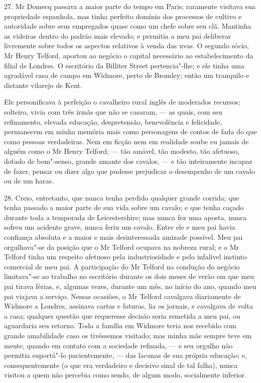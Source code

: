 27. Mr Domecq passava a maior parte do tempo em Paris; raramente
visitava sua propriedade espanhola, mas tinha perfeito domínio dos
processos de cultivo e autoridade sobre seus empregados quase como um
chefe sobre seu clã. Mantinha as videiras dentro do padrão mais elevado;
e permitia a meu pai deliberar livremente sobre todos os aspectos
relativos à venda das uvas. O segundo sócio, Mr Henry Telford, aportou
ao negócio o capital necessário ao estabelecimento da filial de Londres.
O escritório da Billiter Street pertencia"-lhe; e ele tinha uma agradável
casa de campo em Widmore, perto de Bromley; então um tranquilo e
distante vilarejo de Kent.

Ele personificava à perfeição o cavalheiro rural inglês de moderados
recursos; solteiro, vivia com três irmãs que não se casaram, --- as
quais, com seu refinamento, elevada educação, despretensão, benevolência
e felicidade, permanecem em minha memória mais como personagens de
contos de fada do que como pessoas verdadeiras. Nem em ficção nem em
realidade soube eu jamais de alguém como o Mr Henry Telford; --- tão
amável, tão modesto, tão afetuoso, dotado de bom"-senso, grande amante
dos cavalos, --- e tão inteiramente incapaz de fazer, pensar ou dizer
algo que pudesse prejudicar o desempenho de um cavalo ou de um haras.

28. Creio, entretanto, que nunca tenha perdido qualquer grande corrida;
que tenha passado a maior parte de sua vida sobre um cavalo; e que tenha
caçado durante toda a temporada de Leicestershire; mas nunca fez uma
aposta, nunca sofreu um acidente grave, nunca feriu um cavalo. Entre ele
e meu pai havia confiança absoluta e a maior e mais desinteressada
amizade possível. Meu pai orgulhava"-se da posição que o Mr Telford
ocupava na nobreza rural; e o Mr Telford tinha um respeito afetuoso pela
industriosidade e pelo infalível instinto comercial de meu pai. A
participação do Mr Telford na condução do negócio limitava"-se ao
trabalho no escritório durante os dois meses de verão em que meu pai
tirava férias, e, algumas vezes, durante um mês, no início do ano,
quando meu pai viajava a serviço. Nessas ocasiões, o Mr Telford
cavalgava diariamente de Widmore a Londres, assinava cartas e faturas,
lia os jornais, e cavalgava de volta a casa; qualquer questão que
requeresse decisão seria remetida a meu pai, ou aguardaria seu retorno.
Toda a família em Widmore teria nos recebido com grande amabilidade caso
os tivéssemos visitado; mas minha mãe sempre teve em mente, quando em
contato com a sociedade refinada, --- e seu orgulho não permitia
suportá"-lo pacientemente, --- das lacunas de sua própria educação; e,
consequentemente (o que era verdadeiro e decisivo sinal de tal falha),
nunca visitou a quem não percebia como sendo, de algum modo, socialmente
inferior.


